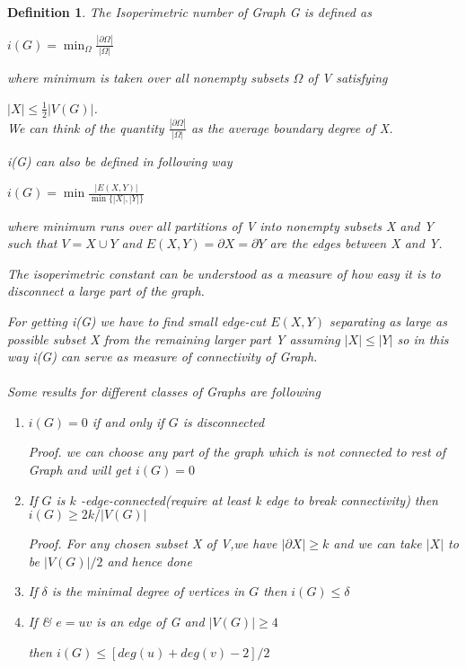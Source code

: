 \documentclass[oneside]{book}
\newtheorem{mydef}{Definition}
\begin{document}
\begin{mydef}
           
           The Isoperimetric number of Graph G is defined as \par
           \begin{center}
               $i(G)=\min _{\Omega} \frac{|\partial \Omega|}{|\Omega|}$
           \end{center}
           where minimum is taken over all nonempty subsets $\Omega$ of V satisfying\par $|X| \leq \frac{1}{2}|V(G)|$.
\\           We can think of the quantity  $\frac{|\partial \Omega|}{|\Omega|}$ as the average boundary degree of X. \par
           i(G) can also be defined in following way \par
           \begin{center}
               $i(G)=\min \frac{|E(X, Y)|}{\min \{|X|,|Y|\}}$
           \end{center}
            where minimum runs over all partitions of V into nonempty subsets X and Y such that  $V=X \cup Y$ and $E(X, Y)=\partial X=\partial Y$ are the edges between X and Y.
           \par
           The isoperimetric constant can be understood as a measure of how easy
it is to disconnect a large part of the graph. \par
           For getting i(G) we have to find small edge-cut $E(X, Y)$ separating as large as possible  subset X from the remaining larger part Y assuming $|X|\leq |Y|$ so in this way i(G) can serve as measure of connectivity of Graph. \\\\
           Some results for different classes of Graphs are following \par
           \begin{enumerate}
             
          
               \item  $i(G)=0$ if and only if $G$ is disconnected \par
               Proof. we can choose  any part of the graph which is not connected to rest of Graph and will get $i(G)=0$ \par
               \item  If $G$ is $k$ -edge-connected(require at least k edge to break connectivity) then $i(G) \geq 2 k /|V(G)|$ \par
        Proof. For any chosen subset X of V,we have  $|\partial X| \geq k$ and we can take $|X|$ to be $|V(G)|/2$ and hence done\par
        \item  If $\delta$ is the minimal degree of vertices in $G$ then $i(G) \leq\delta$ \par
        \item  If  & $e=u v$ is   an  edge  of G  and $|V(G)| \geq 4$ \par then  $i(G) \leq [deg(u)+deg(v)-2] / 2$ \par
            \end{enumerate}
          

\end{mydef}
\end{document}

